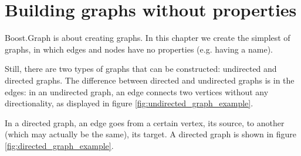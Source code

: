 \chapter{Building graphs without properties}
\label{sec:Building-graphs-without-properties}

Boost.Graph is about creating graphs.
In this chapter we create the simplest of graphs, in which edges and nodes
have no properties (e.g. having a name).

Still, there are two types of graphs that can be constructed: undirected
and directed graphs.
The difference between directed and undirected graphs is in the edges:
in an undirected graph, 
an edge connects two vertices without any directionality, as displayed
in figure \ref{fig:undirected_graph_example}.

In a directed graph, an edge goes from a certain vertex, its source, to another (which may
 actually be the same), its target.
 A directed graph is shown in figure 
\ref{fig:directed_graph_example}.



